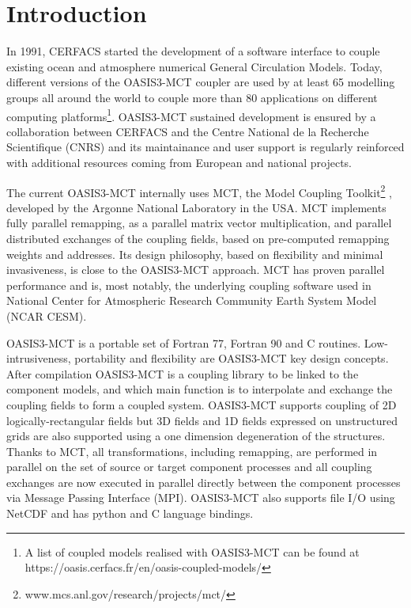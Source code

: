 \newpage
\chapter{Introduction}
\label{sec_step}

In 1991, CERFACS started the development of
a software interface to couple existing ocean and atmosphere numerical General
Circulation Models. Today, different versions of the 
OASIS3-MCT coupler are used by at least 65 modelling groups all around the
world to couple more than 80 applications on different computing platforms\footnote{A list of
coupled models realised with OASIS3-MCT can be found at https://oasis.cerfacs.fr/en/oasis-coupled-models/}.
OASIS3-MCT sustained development is ensured by a collaboration
between CERFACS and the Centre National de la Recherche Scientifique
(CNRS) and its maintainance and user support is regularly reinforced
with additional resources coming from European and national projects.

The current OASIS3-MCT internally uses MCT, the Model
Coupling Toolkit\footnote{www.mcs.anl.gov/research/projects/mct/} \citep{mct_larson} \newline \citep{mct_jacob}, developed by the Argonne National Laboratory in the USA. MCT implements fully parallel remapping, as a parallel matrix vector 
multiplication, and parallel distributed exchanges of the coupling
fields, based on pre-computed remapping weights and addresses. 
Its design philosophy, based on flexibility and minimal invasiveness,
is close to the OASIS3-MCT approach. 
MCT has proven parallel performance and is, most notably, the
underlying coupling software used in National Center for Atmospheric
Research Community Earth System Model (NCAR CESM).

OASIS3-MCT is a portable set of Fortran 77, Fortran 90 and C
routines. Low-intrusiveness, portability and flexibility are
OASIS3-MCT key design concepts. After compilation OASIS3-MCT is a
coupling library to be linked to the component models, and which main
function is to interpolate and exchange the coupling fields to form a coupled system.  OASIS3-MCT supports  coupling of 2D
logically-rectangular fields but 3D fields and 1D fields expressed on
unstructured grids are also supported using a one dimension
degeneration of the structures. Thanks to MCT, all transformations,
including remapping, are performed in parallel on the set of source or
target component processes and all coupling exchanges are now executed
in parallel directly between the component processes via Message Passing Interface
(MPI). OASIS3-MCT also supports file I/O using NetCDF and has python and C language bindings. 

